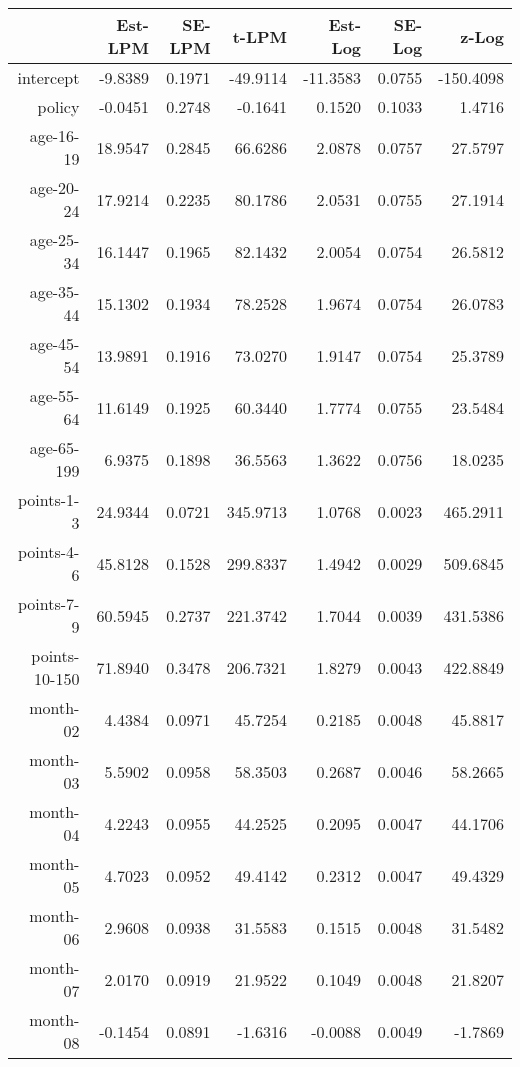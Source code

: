 \documentclass[10pt]{article}
\begin{document}

\begin{table}[ht]
\centering
\begin{tabular}{rrrrrrr}
  \hline
 & Est-LPM & SE-LPM & t-LPM & Est-Log & SE-Log & z-Log \\ 
  \hline
intercept & -9.8389 & 0.1971 & -49.9114 & -11.3583 & 0.0755 & -150.4098 \\ 
  policy & -0.0451 & 0.2748 & -0.1641 & 0.1520 & 0.1033 & 1.4716 \\ 
  age-16-19 & 18.9547 & 0.2845 & 66.6286 & 2.0878 & 0.0757 & 27.5797 \\ 
  age-20-24 & 17.9214 & 0.2235 & 80.1786 & 2.0531 & 0.0755 & 27.1914 \\ 
  age-25-34 & 16.1447 & 0.1965 & 82.1432 & 2.0054 & 0.0754 & 26.5812 \\ 
  age-35-44 & 15.1302 & 0.1934 & 78.2528 & 1.9674 & 0.0754 & 26.0783 \\ 
  age-45-54 & 13.9891 & 0.1916 & 73.0270 & 1.9147 & 0.0754 & 25.3789 \\ 
  age-55-64 & 11.6149 & 0.1925 & 60.3440 & 1.7774 & 0.0755 & 23.5484 \\ 
  age-65-199 & 6.9375 & 0.1898 & 36.5563 & 1.3622 & 0.0756 & 18.0235 \\ 
  points-1-3 & 24.9344 & 0.0721 & 345.9713 & 1.0768 & 0.0023 & 465.2911 \\ 
  points-4-6 & 45.8128 & 0.1528 & 299.8337 & 1.4942 & 0.0029 & 509.6845 \\ 
  points-7-9 & 60.5945 & 0.2737 & 221.3742 & 1.7044 & 0.0039 & 431.5386 \\ 
  points-10-150 & 71.8940 & 0.3478 & 206.7321 & 1.8279 & 0.0043 & 422.8849 \\ 
  month-02 & 4.4384 & 0.0971 & 45.7254 & 0.2185 & 0.0048 & 45.8817 \\ 
  month-03 & 5.5902 & 0.0958 & 58.3503 & 0.2687 & 0.0046 & 58.2665 \\ 
  month-04 & 4.2243 & 0.0955 & 44.2525 & 0.2095 & 0.0047 & 44.1706 \\ 
  month-05 & 4.7023 & 0.0952 & 49.4142 & 0.2312 & 0.0047 & 49.4329 \\ 
  month-06 & 2.9608 & 0.0938 & 31.5583 & 0.1515 & 0.0048 & 31.5482 \\ 
  month-07 & 2.0170 & 0.0919 & 21.9522 & 0.1049 & 0.0048 & 21.8207 \\ 
  month-08 & -0.1454 & 0.0891 & -1.6316 & -0.0088 & 0.0049 & -1.7869 \\ 

\end{tabular}
\end{table}
\end{document}
